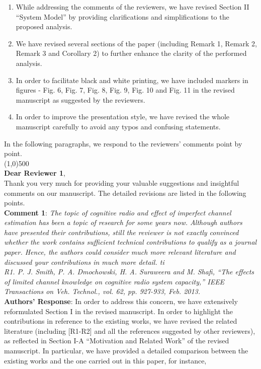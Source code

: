 \documentclass[12pt,a4wide,peerreview]{IEEEtran}
\begin{document}
\begin{enumerate}
 \item While addressing the comments of the reviewers, we have revised Section II ``System Model'' by providing clarifications and simplifications to the proposed analysis. 
 \item We have revised several sections of the paper (including Remark 1, Remark 2, Remark 3 and Corollary 2) to further enhance the clarity of the performed analysis. 
 \item In order to facilitate black and white printing, we have included markers in figures - Fig. 6, Fig. 7, Fig. 8, Fig. 9, Fig. 10 and Fig. 11 in the revised manuscript as suggested by the reviewers. 
  \item In order to improve the presentation style, we have revised the whole manuscript carefully to avoid any typos and confusing statements.  
\end{enumerate}
In the following paragraphs, we respond to the reviewers' comments point by point. \\
\line(1,0){500} \\
\textbf{Dear Reviewer 1},\\
\baselineskip24pt
Thank you very much for providing your valuable suggestions and insightful comments on our manuscript. The detailed revisions are listed in the following points. 
\\
\textbf{Comment 1}: 
\textit{
The topic of cognitive radio and effect of imperfect channel estimation has been a topic of research for some years now. Although authors have presented their contributions, still the reviewer is not exactly convinced whether the work contains sufficient technical contributions to qualify as a journal paper. Hence, the authors could consider much more relevant literature and discussed your contributions in much more detail. 
ti
\\ 
R1. P. J. Smith, P. A. Dmochowski, H. A. Suraweera and M. Shafi, ``The effects of limited channel knowledge on cognitive radio system capacity,'' IEEE Transactions on Veh. Technol., vol. 62, pp. 927-933, Feb. 2013.
}
\\
\textbf{Authors' Response}:
In order to address this concern, we have extensively reformulated Section I in the revised manuscript. In order to highlight the contributions in reference to the existing works, we have revised the related literature (including [R1-R2] and all the references suggested by other reviewers), as reflected in Section I-A ``Motivation and Related Work'' of the revised manuscript. In particular, we have provided a detailed comparison between the existing works and the one carried out in this paper, for instance,
\end{document}
